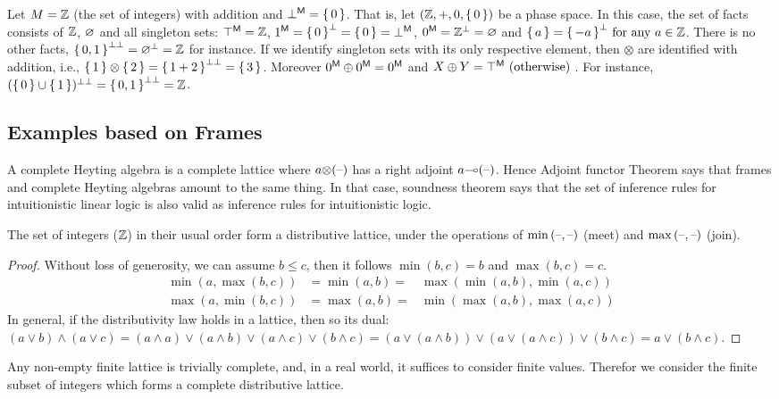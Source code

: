 \begin{example}
Let $M = {\mathbb{Z}}$ (the set of integers) with addition and ${\bot}^{\sf M} = \set{0}$. 
That is, let $({\mathbb{Z}},+,0,\set{0})$ be a phase space. 
In this case, the set of facts consists of ${\mathbb{Z}}$, $\varnothing$ and all singleton sets: 
${\top}^{\sf M} = {\mathbb{Z}}$, 
${\mbox{\boldmath{1}}}^{\sf M} = {{\set{0}}^{\bot}} = \set{0} = {\bot}^{\sf M}$,
${\mbox{\boldmath{0}}}^{\sf M} = {{{\mathbb{Z}}}^{\bot}} = \varnothing$ and
$\set{a} = {{\set{-a}}^{\bot}}  \mbox{ for any } a \in {\mathbb{Z}}$.
%
There is no other facts, ${{\set{0,1}}^{\bot\bot}} = {{\varnothing}^{\bot}} = {\mathbb{Z}}$ for instance.  
If we identify singleton sets with its only respective element, 
then $\otimes$ are identified with addition, i.e., $\set{1} \otimes \set{2} = {{\set{1+2}}^{\bot\bot}} = \set{3}$.  
Moreover ${\mbox{\boldmath{0}}}^{\sf M} \oplus {\mbox{\boldmath{0}}}^{\sf M} = {\mbox{\boldmath{0}}}^{\sf M}$  and 
$X \oplus Y = {\top}^{\sf M} \mbox{ (otherwise) }$.  
For instance, 
${(\set{0} \cup \set{1})^{\bot\bot}} = {{\set{0,1}}^{\bot\bot}} = {\mathbb{Z}}$. 
\end{example}






\subsection{Examples based on Frames}
A complete Heyting algebra is a complete lattice 
where $a { \otimes } {{(\mbox{\textendash})}}$ has a right adjoint $a { \multimap } {{(\mbox{\textendash})}}$. 
Hence Adjoint functor Theorem says that frames and complete Heyting algebras amount to the same thing.
%
In that case, soundness theorem says that the set of inference rules for intuitionistic linear logic is also valid as inference rules for intuitionistic logic. 
\begin{proposition}
The set of integers (${\mathbb{Z}}$) 
in their usual order form a distributive lattice, 
under the operations of $\min{{(\mbox{\textendash},\mbox{\textendash})}}$ (meet) 
and $\max{{(\mbox{\textendash},\mbox{\textendash})}}$ (join). 
\end{proposition}
\begin{proof}
Without loss of generosity, we can assume $b \leq c$, 
then it follows $\min(b,c) = b$ and $\max(b,c) = c$. 
\begin{eqnarray*}
\min(a,\max(b,c)) &= \min(a,b) =& \max(\min(a,b),\min(a,c)) \\
\max(a,\min(b,c)) &= \max(a,b) =& \min(\max(a,b),\max(a,c)) 
\end{eqnarray*}
In general, if the distributivity law holds in a lattice, then so its dual:
$ (a \vee b) \wedge (a \vee c) 
= (a \wedge a) \vee (a \wedge b) \vee (a \wedge c) \vee ( b \wedge c) 
= (a \vee ( a \wedge b)) \vee  (a \vee ( a \wedge c)) \vee ( b \wedge c)
=  a \vee ( b \wedge c)$.
\end{proof}
%
Any non-empty finite lattice is trivially complete,
and,  in a real world,  it suffices to consider finite values. 
Therefor we consider the finite subset of integers which forms a complete distributive lattice. 
%

